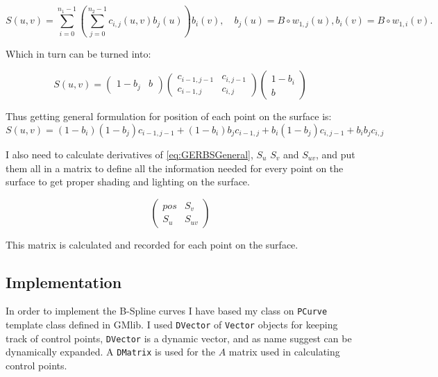 \documentclass[a4paper,12pt]{extarticle}
\begin{document}
\begin{equation}
S(u,v)= \sum_{i=0}^{n_1-1} \left( \sum_{j=0}^{n_2-1} c_{i,j}(u,v) b_j(u) \right) b_i(v), \quad b_j(u) = B \circ w_{1,j}(u), b_i(v) = B \circ w_{1,i}(v).
\label{eq:GERBSSurfFormula}
\end{equation}

Which in turn can be turned into:

\begin{equation}
S(u,v)=
\begin{pmatrix}
1-b_j & b
\end{pmatrix}
\begin{pmatrix}
c_{i-1,j-1} & c_{i,j-1}\\
c_{i-1,j} & c_{i,j}
\end{pmatrix}
\begin{pmatrix}
1-b_i \\
b
\end{pmatrix}
\end{equation}

Thus getting general formulation for position of each point on the surface is:
\begin{equation}
  S(u,v)= (1-b_i) (1-b_j) c_{i-1,j-1} + (1-b_i) b_j c_{i-1,j} + b_i (1-b_j) c_{i,j-1} + b_i b_j c_{i,j}
  \label{eq:GERBSGeneral}
\end{equation}

I also need to calculate derivatives of \cref{eq:GERBSGeneral}, $S_u$ $S_v$ and $S_{uv}$, and put them all in a matrix to define all the information needed for every point on the surface to get proper shading and lighting on the surface.

\begin{equation}
\begin{pmatrix}
pos & S_v\\
S_u & S_{uv}
\end{pmatrix}
\end{equation}

This matrix is calculated and recorded for each point on the surface.

\subsection{Implementation}
In order to implement the B-Spline curves I have based my class on \verb|PCurve| template class defined in GMlib. I used \verb|DVector| of \verb|Vector| objects for keeping track of control points, \verb|DVector| is a dynamic vector, and as name suggest can be dynamically expanded. A \verb|DMatrix| is used for the $A$ matrix used in calculating control points.
\end{document}
